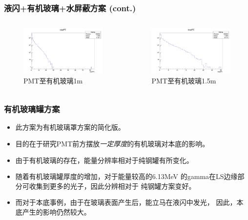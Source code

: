 \begin{frame}
    \frametitle{液闪+有机玻璃+水屏蔽方案 (cont.)}
    \begin{columns}
        \column{6.5cm}
        \begin{figure}
            \includegraphics[width=6.5cm,keepaspectratio]{data/water_1.0m_K40_totalPE.png}
            \caption{PMT至有机玻璃1m}
        \end{figure}
        \column{6.5cm}
        \begin{figure}
            \includegraphics[width=6.5cm,keepaspectratio]{data/water_1.5m_K40_totalPE.png}
            \caption{PMT至有机玻璃1.5m}
        \end{figure}
    \end{columns}
\end{frame}

\begin{frame}
    \frametitle{有机玻璃罐方案}
    \begin{itemize}
        \item 此方案为有机玻璃罩方案的简化版。
        \item 目的在于研究PMT前方摆放{\em 一定厚度}的有机玻璃对本底的影响。
        \item 由于有机玻璃的存在，能量分辨率相对于纯钢罐有所变化。
        \item 随着有机玻璃罐厚度的增加，对于能量较高的6.13MeV
              的gamma在LS边缘部分可收集到更多的光子，因此分辨相对于
              纯钢罐方案变好。
        \item 而对于本底事例，由于在玻璃表面产生后，能立马在液闪中发光，
              因此，本底产生的影响仍然较大。
    \end{itemize}
\end{frame}

